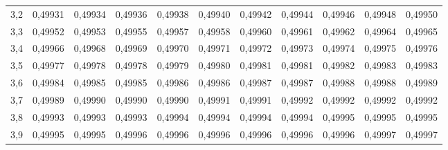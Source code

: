\documentclass[14pt,aspectratio=1610]{beamer}
\begin{document}
\begin{frame}[fragile]{}
\begin{block}{}
\begin{center}
{\begin{tabular}{rrrrrrrrrrr}
  3,2 & 0,49931 & 0,49934 & 0,49936 & 0,49938 & 0,49940 & 0,49942 & 0,49944 & 0,49946 & 0,49948 & 0,49950 \\ 
  3,3 & 0,49952 & 0,49953 & 0,49955 & 0,49957 & 0,49958 & 0,49960 & 0,49961 & 0,49962 & 0,49964 & 0,49965 \\ 
  3,4 & 0,49966 & 0,49968 & 0,49969 & 0,49970 & 0,49971 & 0,49972 & 0,49973 & 0,49974 & 0,49975 & 0,49976 \\ 
  3,5 & 0,49977 & 0,49978 & 0,49978 & 0,49979 & 0,49980 & 0,49981 & 0,49981 & 0,49982 & 0,49983 & 0,49983 \\ 
  3,6 & 0,49984 & 0,49985 & 0,49985 & 0,49986 & 0,49986 & 0,49987 & 0,49987 & 0,49988 & 0,49988 & 0,49989 \\ 
  3,7 & 0,49989 & 0,49990 & 0,49990 & 0,49990 & 0,49991 & 0,49991 & 0,49992 & 0,49992 & 0,49992 & 0,49992 \\ 
  3,8 & 0,49993 & 0,49993 & 0,49993 & 0,49994 & 0,49994 & 0,49994 & 0,49994 & 0,49995 & 0,49995 & 0,49995 \\ 
  3,9 & 0,49995 & 0,49995 & 0,49996 & 0,49996 & 0,49996 & 0,49996 & 0,49996 & 0,49996 & 0,49997 & 0,49997 \\ 
   \hline
\end{tabular}}
\end{center}
\end{block}
\end{frame}

\begin{frame}{}
\frametitle{}
\begin{block}{}
\justifying

\end{block}
\end{frame}
\end{document}
